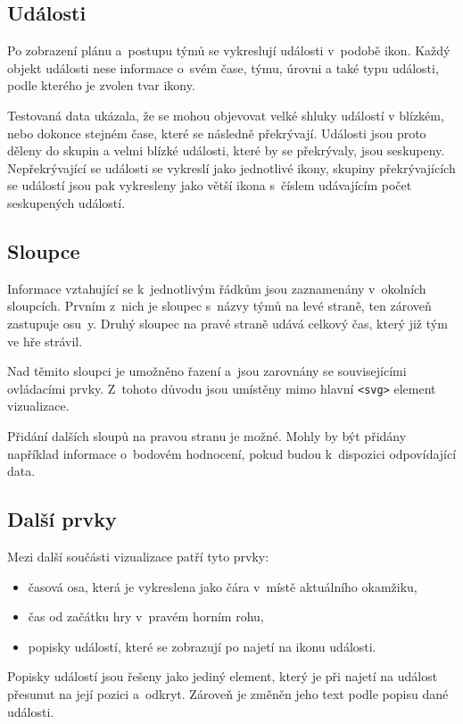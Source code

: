 \documentclass[
  digital, %
  oneside, %
  table,   %
  nolof,     %
  nolot,     %
  nocover
]{fithesis3}
\begin{document}
\subsection{Události}
Po zobrazení plánu a~postupu týmů se vykreslují události v~podobě ikon. Každý objekt události nese informace o~svém čase, týmu, úrovni a také typu události, podle kterého je zvolen tvar ikony.\par Testovaná data ukázala, že se mohou objevovat velké shluky událostí v blízkém, nebo dokonce stejném čase, které se následně překrývají. Události jsou proto děleny do skupin a velmi blízké události, které by se překrývaly, jsou seskupeny. Nepřekrývající se události se vykreslí jako jednotlivé ikony, skupiny překrývajících se událostí jsou pak vykresleny jako větší ikona s~číslem udávajícím počet seskupených událostí.
\subsection{Sloupce}
Informace vztahující se k~jednotlivým řádkům jsou zaznamenány v~okolních sloupcích. Prvním z~nich je sloupec s~názvy týmů na levé straně, ten zároveň zastupuje osu~y. Druhý sloupec na pravé straně udává celkový čas, který již tým ve hře strávil.\par
Nad těmito sloupci je umožněno řazení a~jsou zarovnány se souvisejícími ovládacími prvky. Z~tohoto důvodu jsou umístěny mimo hlavní \verb|<svg>| element vizualizace.\par
Přidání dalších sloupů na pravou stranu je možné. Mohly by být přidány například informace o~bodovém hodnocení, pokud budou k~dispozici odpovídající data.
\subsection{Další prvky}
Mezi další součásti vizualizace patří tyto prvky:
\begin{itemize}
  \item časová osa, která je vykreslena jako čára v~místě aktuálního okamžiku,
  \item čas od začátku hry v~pravém horním rohu,
  \item popisky událostí, které se zobrazují po najetí na ikonu události.
\end{itemize}
Popisky událostí jsou řešeny jako jediný element, který je při najetí na událost přesunut na její pozici a~odkryt. Zároveň je změněn jeho text podle popisu dané události.
\end{document}
